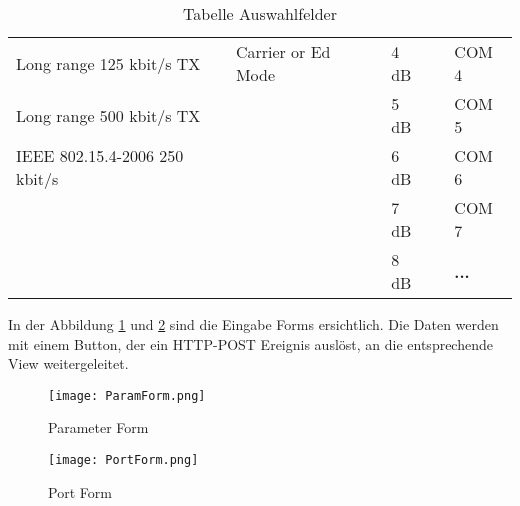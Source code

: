 \begin{table}[H]
\begin{adjustbox}{width=1\textwidth}
\begin{tabular}{@{}llll|l|l|l|@{}}
			\multicolumn{1}{|l|}{Long range 125 kbit/s TX}      & \multicolumn{1}{l|}{} & \multicolumn{1}{l|}{Carrier or Ed Mode}       &  & 4 dB                                           &  & COM 4                                      \\ \cmidrule(r){1-1} \cmidrule(lr){3-3} \cmidrule(lr){5-5} \cmidrule(l){7-7} 
			\multicolumn{1}{|l|}{Long range 500 kbit/s TX}      &                       &                                               &  & 5 dB                                           &  & COM 5                                      \\ \cmidrule(r){1-1} \cmidrule(lr){5-5} \cmidrule(l){7-7} 
			\multicolumn{1}{|l|}{IEEE 802.15.4-2006 250 kbit/s} &                       &                                               &  & 6 dB                                           &  & COM 6                                      \\ \cmidrule(r){1-1} \cmidrule(lr){5-5} \cmidrule(l){7-7} 
			&                       &                                               &  & 7 dB                                           &  & COM 7                                      \\ \cmidrule(lr){5-5} \cmidrule(l){7-7} 
			&                       &                                               &  & 8 dB                                           &  & \textbf{...}                               \\ \cmidrule(lr){5-5} \cmidrule(l){7-7} 
		\end{tabular}
	\end{adjustbox}
	\caption{Tabelle Auswahlfelder}
	\label{table:TabelleAuswahlfelder}
\end{table}

In der Abbildung \ref{fig:ParamForm} und \ref{fig:PortForm} sind die Eingabe Forms ersichtlich. Die Daten werden mit einem Button, der ein HTTP-POST Ereignis auslöst, an die entsprechende View weitergeleitet.

\begin{figure} [H]
	\centering
	\texttt{[image: ParamForm.png]}
	\caption{Parameter Form}
	\label{fig:ParamForm}
\end{figure}


\begin{figure} [H]
	\centering
	\texttt{[image: PortForm.png]}
	\caption{Port Form}
	\label{fig:PortForm}
\end{figure}

\newpage

